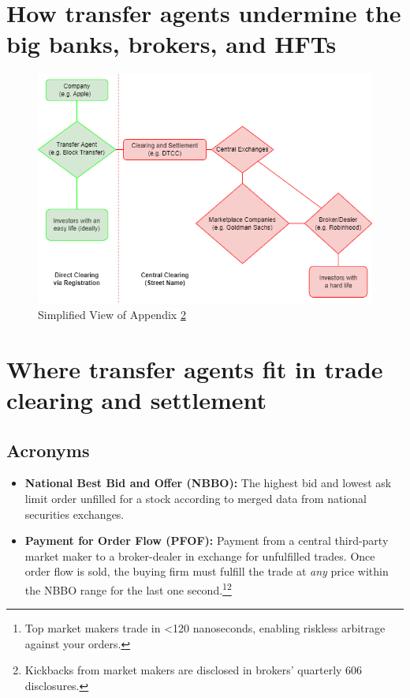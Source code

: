 \documentclass[11pt, english]{article}
\begin{document}
\pagebreak
\begin{multicols}{2}

\footnotesize{
    
    
}

\end{multicols}

\appendix



\section{How transfer agents undermine the big banks, brokers, and HFTs}

\begin{figure}[H]
    \centering
    \includegraphics[width=420pt]{imgs/ownership-simplified.png}
    \caption{Simplified View of Appendix \ref{appendix-b}}
\end{figure}
\pagebreak



\section{Where transfer agents fit in trade clearing and settlement}\label{appendix-b}


\subsection*{Acronyms}

\begin{itemize}
  \item \textbf{National Best Bid and Offer (NBBO):} The highest bid and lowest ask limit order unfilled for a stock according to merged data from national securities exchanges.
  
  \item \textbf{Payment for Order Flow (PFOF):} Payment from a central third-party market maker to a broker-dealer in exchange for unfulfilled trades. Once order flow is sold, the buying firm must fulfill the trade at \textit{any} price within the NBBO range for the last one second.\footnote{Top market makers trade in <120 nanoseconds, enabling riskless arbitrage against your orders.}\footnote{Kickbacks from market makers are disclosed in brokers' quarterly 606 disclosures.}
\end{itemize}
\end{document}
